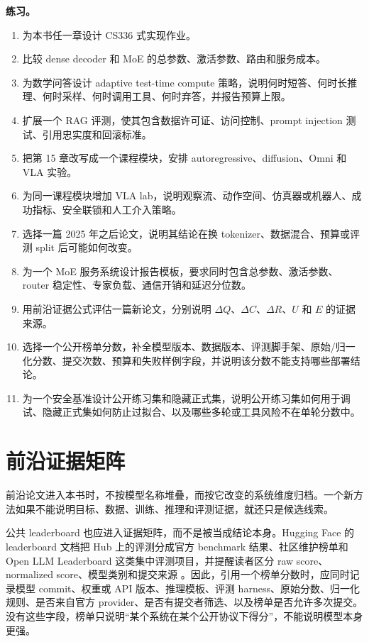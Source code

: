 \documentclass[UTF8,zihao=-4,openany]{ctexbook}
\begin{document}
\textbf{练习。}
\begin{enumerate}
\item 为本书任一章设计 CS336 式实现作业。
\item 比较 dense decoder 和 MoE 的总参数、激活参数、路由和服务成本。
\item 为数学问答设计 adaptive test-time compute 策略，说明何时短答、何时长推理、何时采样、何时调用工具、何时弃答，并报告预算上限。
\item 扩展一个 RAG 评测，使其包含数据许可证、访问控制、prompt injection 测试、引用忠实度和回滚标准。
\item 把第 15 章改写成一个课程模块，安排 autoregressive、diffusion、Omni 和 VLA 实验。
\item 为同一课程模块增加 VLA lab，说明观察流、动作空间、仿真器或机器人、成功指标、安全联锁和人工介入策略。
\item 选择一篇 2025 年之后论文，说明其结论在换 tokenizer、数据混合、预算或评测 split 后可能如何改变。
\item 为一个 MoE 服务系统设计报告模板，要求同时包含总参数、激活参数、router 稳定性、专家负载、通信开销和延迟分位数。
\item 用前沿证据公式评估一篇新论文，分别说明 $\Delta Q$、$\Delta C$、$\Delta R$、$U$ 和 $E$ 的证据来源。
\item 选择一个公开榜单分数，补全模型版本、数据版本、评测脚手架、原始/归一化分数、提交次数、预算和失败样例字段，并说明该分数不能支持哪些部署结论。
\item 为一个安全基准设计公开练习集和隐藏正式集，说明公开练习集如何用于调试、隐藏正式集如何防止过拟合、以及哪些多轮或工具风险不在单轮分数中。
\end{enumerate}

\section{前沿证据矩阵}
前沿论文进入本书时，不按模型名称堆叠，而按它改变的系统维度归档。一个新方法如果不能说明目标、数据、训练、推理和评测证据，就还只是候选线索。

公共 leaderboard 也应进入证据矩阵，而不是被当成结论本身。Hugging Face 的 leaderboard 文档把 Hub 上的评测分成官方 benchmark 结果、社区维护榜单和 Open LLM Leaderboard 这类集中评测项目，并提醒读者区分 raw score、normalized score、模型类别和提交来源 \cite{huggingface2026leaderboards,huggingface2026openllmfaq}。因此，引用一个榜单分数时，应同时记录模型 commit、权重或 API 版本、推理模板、评测 harness、原始分数、归一化规则、是否来自官方 provider、是否有提交者筛选、以及榜单是否允许多次提交。没有这些字段，榜单只说明“某个系统在某个公开协议下得分”，不能说明模型本身更强。
\end{document}
